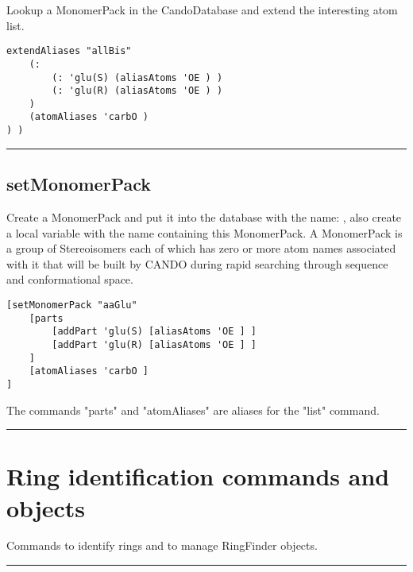 \begin{itemize}
Lookup a MonomerPack in the CandoDatabase and extend the interesting atom list.



\begin{verbatim}
extendAliases "allBis"
    (:
        (: 'glu(S) (aliasAtoms 'OE ) )
        (: 'glu(R) (aliasAtoms 'OE ) )
    )
    (atomAliases 'carbO )
) )
\end{verbatim}

\rule{6in}{0.01cm}\par
{}\par
\subsection{setMonomerPack}
\par
{}\par

Create a MonomerPack and put it into the database with the name: , also create a local variable with the name  containing this MonomerPack. A MonomerPack is a group of Stereoisomers each of which has zero or more atom names associated with it that will be built by CANDO during rapid searching through sequence and conformational space. 

\begin{verbatim}
[setMonomerPack "aaGlu"
    [parts
        [addPart 'glu(S) [aliasAtoms 'OE ] ]
        [addPart 'glu(R) [aliasAtoms 'OE ] ]
    ]
    [atomAliases 'carbO ]
]
\end{verbatim}

The commands "parts" and "atomAliases" are aliases for the "list" command.

\rule{6in}{0.01cm}\par
{}\par
\section{Ring identification commands and objects}
Commands to identify rings and to manage RingFinder objects.

\rule{6in}{0.01cm}\par
{}\par

\end{itemize}
